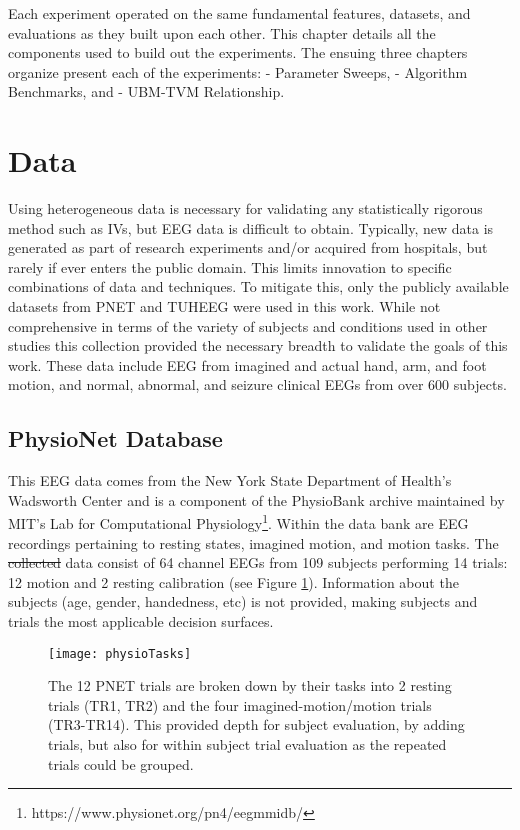 Each experiment operated on the same fundamental features, datasets, and evaluations as they built upon each other. This chapter details all the components used to build out the experiments. The ensuing three chapters organize present each of the experiments:  - Parameter Sweeps,  - Algorithm Benchmarks, and  - \ac{UBM}-\ac{TVM} Relationship.

\section{Data}

Using heterogeneous data is necessary for validating any statistically rigorous method such as \acp{IV}, but \ac{EEG} data is difficult to obtain. Typically, new data is generated as part of research experiments and/or acquired from hospitals, but rarely if ever enters the public domain. This limits innovation to specific combinations of data and techniques. To mitigate this, only the publicly available datasets from \ac{PNET}\cite{Goldberger2000} and \ac{TUHEEG}\cite{Obeid2016a} were used in this work. While not comprehensive in terms of the variety of subjects and conditions used in other studies this collection provided the necessary breadth to validate the goals of this work. These data include \ac{EEG} from imagined and actual hand, arm, and foot motion, and normal, abnormal, and seizure clinical \acp{EEG} from over 600 subjects.

\subsection{PhysioNet Database}

This \ac{EEG} data comes from the New York State Department of Health's Wadsworth Center \cite{Schalk2004} and is a component of the PhysioBank archive maintained by MIT's Lab for Computational Physiology\footnote{https://www.physionet.org/pn4/eegmmidb/}. Within the data bank are \ac{EEG} recordings pertaining to resting states, imagined motion, and motion tasks. The \sout{collected} data consist of 64 channel \acp{EEG} from 109 subjects performing 14 trials: 12 motion and 2 resting calibration (see Figure \ref{fig-chap3_physioTasks}). Information about the subjects (age, gender, handedness, etc) is not provided, making subjects and trials the most applicable decision surfaces.


\begin{figure}
\centering
\texttt{[image: physioTasks]}
\caption[Format of PhysioNet Trials]{The 12 \acf{PNET} trials are broken down by their tasks into 2 resting trials (TR1, TR2) and the four imagined-motion/motion trials (TR3-TR14). This provided depth for subject evaluation, by adding trials, but also for within subject trial evaluation as the repeated trials could be grouped.}
\label{fig-chap3_physioTasks}
\end{figure}

